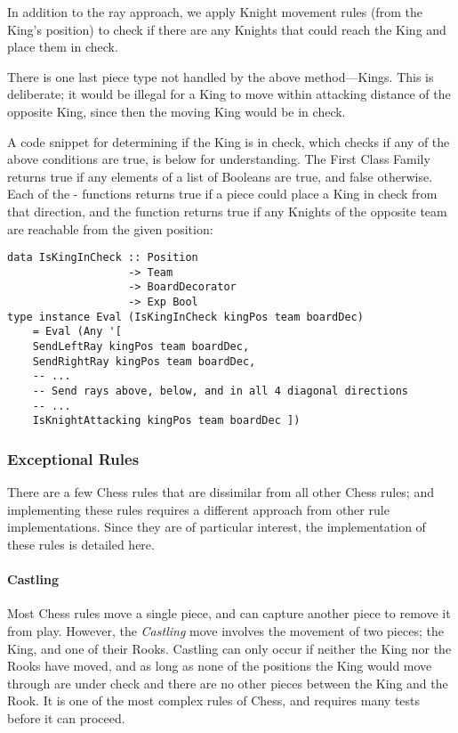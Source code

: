 In addition to the ray approach, we apply Knight movement rules (from the King's position) to check if there are any Knights that could reach the King and place them in check.

There is one last piece type not handled by the above method---Kings. This is deliberate; it would be illegal for a King to move within attacking distance of the opposite King, since then the moving King would be in check.

A code snippet for determining if the King is in check, which checks if any of the above conditions are true, is below for understanding. The First Class Family  returns true if any elements of a list of Booleans are true, and false otherwise. Each of the - functions returns true if a piece could place a King in check from that direction, and the  function returns true if any Knights of the opposite team are reachable from the given position:

\begin{lstlisting}
data IsKingInCheck :: Position
                   -> Team
                   -> BoardDecorator
                   -> Exp Bool
type instance Eval (IsKingInCheck kingPos team boardDec)
    = Eval (Any '[
    SendLeftRay kingPos team boardDec,
    SendRightRay kingPos team boardDec,
    -- ...
    -- Send rays above, below, and in all 4 diagonal directions
    -- ...
    IsKnightAttacking kingPos team boardDec ])
\end{lstlisting}

\subsubsection{Exceptional Rules}

There are a few Chess rules that are dissimilar from all other Chess rules; and implementing these rules requires a different approach from other rule implementations. Since they are of particular interest, the implementation of these rules is detailed here.

\paragraph{Castling} \label{castlesection}

Most Chess rules move a single piece, and can capture another piece to remove it from play. However, the \emph{Castling} move involves the movement of two pieces; the King, and one of their Rooks. Castling can only occur if neither the King nor the Rooks have moved, and as long as none of the positions the King would move through are under check and there are no other pieces between the King and the Rook. It is one of the most complex rules of Chess, and requires many tests before it can proceed.

